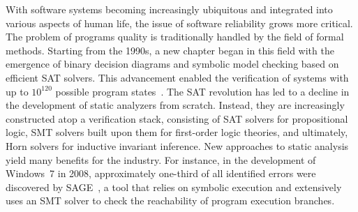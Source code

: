 {\actuality}
With software systems becoming increasingly ubiquitous and integrated into various aspects of human life, the issue of software reliability grows more critical.
The problem of programs quality is traditionally handled by the field of formal methods. Starting from the 1990s, a new chapter began in this field with the emergence of binary decision diagrams and symbolic model checking based on efficient SAT solvers. This advancement enabled the verification of systems with up to \(10^{120}\) possible program states~\cite{10.1007/3-540-61474-5_93}. The SAT revolution has led to a decline in the development of static analyzers from scratch. Instead, they are increasingly constructed atop a verification stack, consisting of SAT solvers for propositional logic, SMT solvers built upon them for first-order logic theories, and ultimately, Horn solvers for inductive invariant inference.
New approaches to static analysis yield many benefits for the industry.
For instance, in the development of Windows~7 in 2008, approximately one-third of all identified errors were discovered by SAGE~\cite{10.1145/2090147.2094081}, a tool that relies on symbolic execution and extensively uses an SMT solver to check the reachability of program execution branches.

